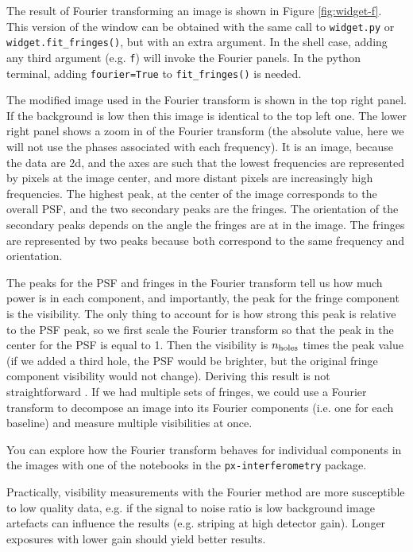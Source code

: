 \documentclass[11pt]{article}
\begin{document}
The result of Fourier transforming an image is shown in Figure \ref{fig:widget-f}. This version of the window can be obtained with the same call to \texttt{widget.py} or \texttt{widget.fit\_fringes()}, but with an extra argument. In the shell case, adding any third argument (e.g. \texttt{f}) will invoke the Fourier panels. In the python terminal, adding \texttt{fourier=True} to \texttt{fit\_fringes()} is needed.

The modified image used in the Fourier transform is shown in the top right panel. If the background is low then this image is identical to the top left one. The lower right panel shows a zoom in of the Fourier transform (the absolute value, here we will not use the phases associated with each frequency). It is an image, because the data are 2d, and the axes are such that the lowest frequencies are represented by pixels at the image center, and more distant pixels are increasingly high frequencies. The highest peak, at the center of the image corresponds to the overall PSF, and the two secondary peaks are the fringes. The orientation of the secondary peaks depends on the angle the fringes are at in the image. The fringes are represented by two peaks because both correspond to the same frequency and orientation.

The peaks for the PSF and fringes in the Fourier transform tell us how much power is in each component, and importantly, the peak for the fringe component is the visibility. The only thing to account for is how strong this peak is relative to the PSF peak, so we first scale the Fourier transform so that the peak in the center for the PSF is equal to 1. Then the visibility is $n_{\rm holes}$ times the peak value (if we added a third hole, the PSF would be brighter, but the original fringe component visibility would not change). Deriving this result is not straightforward \citep[e.g.][section 2.4.3]{2011psi..book.....G}. If we had multiple sets of fringes, we could use a Fourier transform to decompose an image into its Fourier components (i.e. one for each baseline) and measure multiple visibilities at once.

You can explore how the Fourier transform behaves for individual components in the images with one of the notebooks in the \texttt{px-interferometry} package.

Practically, visibility measurements with the Fourier method are more susceptible to low quality data, e.g. if the signal to noise ratio is low background image artefacts can influence the results (e.g. striping at high detector gain). Longer exposures with lower gain should yield better results.
\end{document}
